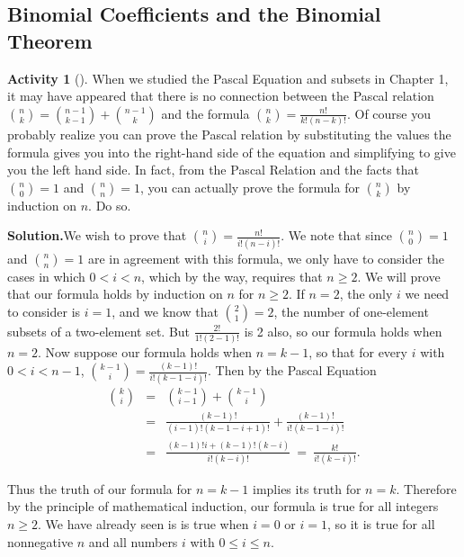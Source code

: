 \documentclass[10pt,]{book}
\theoremstyle{plain}
\theoremstyle{definition}
\newtheorem{activity}[project]{Activity}
\numberwithin{equation}{chapter}
\newcommand{\lt}{<}
\newcommand{\amp}{&}
\begin{document}
\subsection[{Binomial Coefficients and the Binomial Theorem}]{Binomial Coefficients and the Binomial Theorem}\label{subsection-12}
\begin{activity}[]\label{activity-72}
When we studied the Pascal Equation and subsets in Chapter 1, it may have appeared that there is no connection between the Pascal relation \(\binom{n}{k} = \binom{n-1}{k-1} +\binom{n-1}{k}\) and the formula \(\binom{n}{k}=\frac{n!}{k!(n-k)!}\). Of course you probably realize you can prove the Pascal relation by substituting the values the formula gives you into the right-hand side of the equation and simplifying to give you the left hand side. In fact, from the Pascal Relation and the facts that \(\binom{n}{0}=1\) and \(\binom{n}{n}=1\), you can actually prove the formula for \(\binom{n}{k}\) by induction on \(n\). Do so.%
\par\medskip\noindent%
\textbf{Solution.}\quad We wish to prove that \(\binom{n}{i} =\frac{n!}{i!(n-i)!}\). We note that since \(\binom{n}{0}=1\) and \(\binom{n}{n} =1\) are in agreement with this formula, we only have to consider the cases in which \(0\lt i\lt n\), which by the way, requires that \(n\ge 2\). We will prove that our formula holds by induction on \(n\) for \(n\ge 2\). If \(n=2\), the only \(i\) we need to consider is \(i=1\), and we know that \(\binom{2}{1}=2\), the number of one-element subsets of a two-element set. But \(\frac{2!}{1!(2-1)!}\) is 2 also, so our formula holds when \(n=2\). Now suppose our formula holds when \(n=k-1\), so that for every \(i\) with \(0\lt i\lt n-1\), \(\binom{k-1}{i} =
\frac{(k-1)!}{i!(k-1-i)!}\). Then by the Pascal Equation%
\begin{align*}
\binom{k}{i}\amp =\amp \binom{k-1}{i-1}+\binom{k-1}{i}\\
\amp =\amp
\frac{(k-1)!}{(i-1)!(k-1-i+1)!} + \frac{(k-1)!}{i!(k-1-i)!}\\
\amp =\amp \frac{(k-1)!i+(k-1)!(k-i)}{i!(k-i)!} \ =\  \frac{k!}{i!(k-i)!}.
\end{align*}
%
\par
Thus the truth of our formula for \(n=k-1\) implies its truth for \(n=k\). Therefore by the principle of mathematical induction, our formula is true for all integers \(n\ge 2\). We have already seen is is true when \(i=0\) or \(i=1\), so it is true for all nonnegative \(n\) and all numbers \(i\) with \(0\le i\le n\).%
\end{activity}
\end{document}
